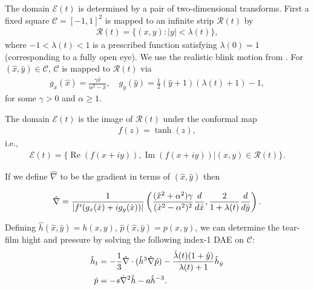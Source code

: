 The domain $\mathcal{E}(t)$ is determined by a pair of two-dimensional transforms. First a fixed square $\mathcal{C}=[-1,1]^2$ is mapped to an infinite strip $\mathcal{R}(t)$ by
\begin{align}
\mathcal{R}(t) = \{(x,y):|y|<\lambda(t)\},
\end{align}
where $-1<\lambda(t)<1$ is a prescribed function satisfying $\lambda(0)=1$ (corresponding to a fully open eye). We use the realistic blink motion from \cite{deng2014heat}. For $(\hat{x},\hat{y}) \in \mathcal{C}$, $\mathcal{C}$ is mapped to $\mathcal{R}(t)$ via
\begin{align}
	g_x(\hat{x}) = \frac{\gamma \hat{x}}{\alpha^2 - \hat{x}}, \quad g_y(\hat{y}) = \frac{1}{2} (\hat{y}+1)(\lambda(t)+1)-1,
\end{align}
for some $\gamma>0$ and $\alpha \geq 1$.


The domain $\mathcal{E}(t)$ is the image of $\mathcal{R}(t)$ under the conformal map
\begin{align}
f(z) = \tanh(z),
\end{align}
i.e.,
\begin{align}
\mathcal{E}(t) = \{\operatorname{Re}(f(x+iy)),\operatorname{Im}(f(x+iy))|(x,y) \in \mathcal{R}(t)  \}.
\end{align}

If we define $\hat{\nabla}$ to be the gradient in terms of $(\hat{x},\hat{y})$ then

\begin{align}
\hat{\nabla} = \frac{1}{|f'(g_x(\hat{x})+i g_y(\hat{x}))|} \left( \frac{(\hat{x}^2+\alpha^2)\gamma}{(\hat{x}^2-\alpha^2)^2} \frac{d}{d \hat{x}}, \frac{2}{1+\lambda(t)} \frac{d}{d \hat{y}} \right).
\end{align}

Defining $\hat{h}(\hat{x},\hat{y})=h(x,y)$, $\hat{p}(\hat{x},\hat{y})=p(x,y)$, we can determine the tear-film hight and pressure by solving the following index-1 DAE on $\mathcal{C}$:
\begin{align}
\begin{aligned}
\hat{h}_t &= -\frac{1}{3} \hat{\nabla} \cdot (\hat{h}^3 \hat{\nabla} \hat{p}) -\frac{\dot{\lambda}(t)(1+\hat{y})}{\lambda(t)+1} \hat{h}_{\hat{y}} \\
\hat{p} &= - s \hat{\nabla}^2 \hat{h} - a \hat{h}^{-3}.
\end{aligned}
\end{align}

